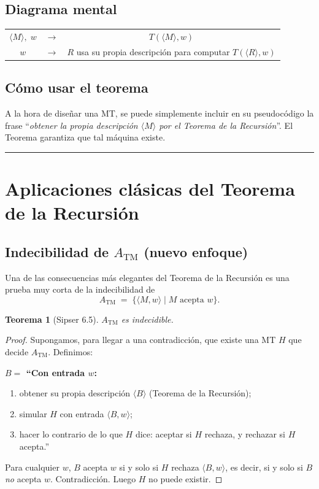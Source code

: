 \documentclass[11pt,a4paper]{article}
\theoremstyle{plain}
\newtheorem{teorema}{Teorema}[section]
\theoremstyle{definition}
\theoremstyle{remark}
\newcommand{\TM}{\mathrm{TM}}
\newcommand{\enc}[1]{\langle #1\rangle}
\newcommand{\encMw}{\langle M, w\rangle}
\newcommand{\ATM}{A_{\TM}}
\begin{document}
\subsection*{Diagrama mental}

\begin{center}
\begin{tabular}{ccc}
$\enc{M},\;w$ & $\rightarrow$ & $T(\enc{M},w)$  \\
$w$           & $\rightarrow$ & $R$ usa su propia descripci\'on para computar $T(\enc{R},w)$ \\
\end{tabular}
\end{center}

\subsection*{C\'omo usar el teorema}

A la hora de dise\~nar una MT, se puede simplemente incluir en su pseudoc\'odigo
la frase ``\emph{obtener la propia descripci\'on $\enc{M}$ por el Teorema
de la Recursi\'on}''. El Teorema garantiza que tal m\'aquina existe.

\bigskip\hrule\bigskip

\section{Aplicaciones cl\'asicas del Teorema de la Recursi\'on}

\subsection{Indecibilidad de $\ATM$ (nuevo enfoque)}

Una de las consecuencias m\'as elegantes del Teorema de la Recursi\'on es una
prueba muy corta de la indecibilidad de
\[
  \ATM \;=\; \{\encMw \mid M \text{ acepta } w\}.
\]

\begin{teorema}[Sipser 6.5]
$\ATM$ es indecidible.
\end{teorema}

\begin{proof}
Supongamos, para llegar a una contradicci\'on, que existe una MT $H$ que
decide $\ATM$. Definimos:

\medskip\noindent\textbf{$B = $ ``Con entrada $w$:}
\begin{enumerate}
  \item obtener su propia descripci\'on $\enc{B}$ (Teorema de la Recursi\'on);
  \item simular $H$ con entrada $\enc{B,w}$;
  \item hacer lo contrario de lo que $H$ dice: aceptar si $H$ rechaza, y
        rechazar si $H$ acepta.''
\end{enumerate}
\medskip

Para cualquier $w$, $B$ acepta $w$ si y solo si $H$ rechaza $\enc{B,w}$, es
decir, si y solo si $B$ \emph{no} acepta $w$. Contradicci\'on. Luego $H$ no
puede existir.
\end{proof}
\end{document}
